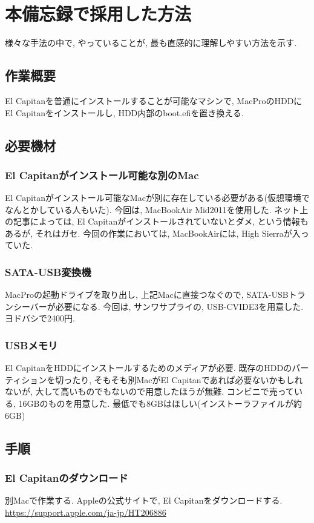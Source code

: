 \documentclass{jsarticle}
\begin{document}
\section{本備忘録で採用した方法}
様々な手法の中で, やっていることが, 最も直感的に理解しやすい方法を示す. 

\subsection{作業概要}
El Capitanを普通にインストールすることが可能なマシンで, MacProのHDDにEl Capitanをインストールし, HDD内部のboot.efiを置き換える. 

\subsection{必要機材}
\subsubsection{El Capitanがインストール可能な別のMac}
El Capitanがインストール可能なMacが別に存在している必要がある(仮想環境でなんとかしている人もいた). 
今回は, MacBookAir Mid2011を使用した. 
ネット上の記事によっては, El Capitanがインストールされていないとダメ, という情報もあるが, それはガセ. 
今回の作業においては, MacBookAirには, High Sierraが入っていた. 

\subsubsection{SATA-USB変換機}
MacProの起動ドライブを取り出し, 上記Macに直接つなぐので, SATA-USBトランシーバーが必要になる. 
今回は, サンワサプライの, USB-CVIDE3を用意した. ヨドバシで2400円. 

\subsubsection{USBメモリ}
El CapitanをHDDにインストールするためのメディアが必要. 
既存のHDDのパーティションを切ったり, そもそも別MacがEl Capitanであれば必要ないかもしれないが, 大して高いものでもないので用意したほうが無難. 
コンビニで売っている, 16GBのものを用意した. 
最低でも8GBはほしい(インストーラファイルが約6GB)

\subsection{手順}
\subsubsection{El Capitanのダウンロード}\label{sequence_download}
別Macで作業する. 
Appleの公式サイトで, El Capitanをダウンロードする. 
\url{https://support.apple.com/ja-jp/HT206886}
\end{document}
